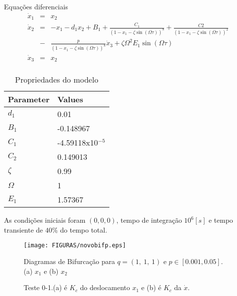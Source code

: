 \documentclass[12pt,aspectratio=169]{beamer}
\begin{document}
\begin{frame}
\begin{block}{Equações diferenciais}
\begin{eqnarray}
\dot{x}_1&=&x_2 \\ \nonumber
\dot{x}_2&=&-x_1-d_1 x_2+B_1+ \frac{C_1}{(1-x_{1}-\zeta\sin(\Omega \tau))^8}+\frac{C2}{(1-x_{1}-\zeta\sin(\Omega \tau))^2} \\ \nonumber
&-&\frac{p}{(1-x_{1}-\zeta\sin(\Omega \tau))^8}\dot{x}_3+\zeta\Omega^2E_1\sin(\Omega \tau) \\ \nonumber
\dot{x}_3&=&x_2 \\ \nonumber
\end{eqnarray}
\end{block}
\end{frame}

\begin{frame}
    \begin{table}[h]
\caption{Propriedades do modelo}
\label{tab:2}       %
\begin{tabular}{ll}
\hline\noalign{\smallskip}
Parameter & Values \\ \hline 
$d_1$ & 0.01 \\  
$B_1$ & -0.148967 \\  
$C_1$ & -4.59118x10${}^{-5}$ \\  
$C_2$ & 0.149013 \\  
${\zeta }$ & 0.99 \\  
$\Omega $ & 1 \\  
$E_1$ & 1.57367 \\ \hline 
\end{tabular}
\end{table}
\par As condições iniciais foram $(0,0,0)$, tempo de integração $10^6[s]$ e tempo transiente de $40\%$ do tempo total.
\end{frame}

\begin{frame}
\begin{figure}[h]
\centering
\texttt{[image: FIGURAS/novobifp.eps]}
\caption{Diagramas de Bifurcação para $q=(1,~1,~1)$ e $p\in[0.001,0.05]$. (a) $x_1$ e (b)  $x_2$}
\end{figure}
\end{frame}

\begin{frame}{}
    \begin{figure}[!ht]
\centering
{}
\caption{Teste 0-1.(a) é $K_c$ do deslocamento $x_1$ e (b) é $K_c$ da $\dot{x}$. }
\label{fig:5}       %
\end{figure}
\end{frame}
\end{document}
